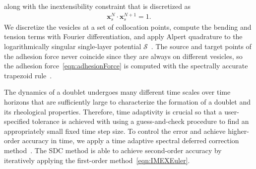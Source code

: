 \documentclass[prf,superscriptaddress,showpacs]{revtex4-1}
\renewcommand{\SS}{\mathcal{S}}
\newcommand{\xx}{\mathbf{x}}
\begin{document}
along with the inextensibility constraint that is discretized as
\begin{align*}
  \xx_s^{N} \cdot \xx_{s}^{N+1} = 1.
\end{align*}
We discretize the vesicles at a set of collocation points, compute the
bending and tension terms with Fourier differentiation, and apply
Alpert quadrature to the logarithmically singular single-layer potential
$\SS$~\cite{alp1999}.  The source and target points of the adhesion
force never coincide since they are always on different vesicles, so the
adhesion force~\eqref{eqn:adhesionForce} is computed with the spectrally
accurate trapezoid rule~\cite{tre-wei2014}.  

The dynamics of a doublet undergoes many different time scales over time
horizons that are sufficiently large to characterize the formation of a
doublet and its rheological properties.  Therefore, time adaptivity is
crucial so that a user-specified tolerance is achieved with using a
guess-and-check procedure to find an appropriately small fixed time step
size.  To control the error and achieve higher-order accuracy in time,
we apply a time adaptive spectral deferred correction
method~\cite{quaife2016adaptive}.  The SDC method is able to achieve
second-order accuracy by iteratively applying the first-order
method~\eqref{eqn:IMEXEuler}.  

\end{document}
